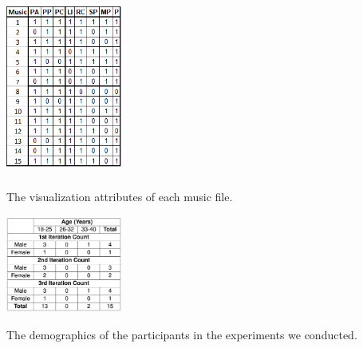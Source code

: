 \documentclass{sigchi-ext}
\begin{document}
\begin{marginfigure}[-7pc]
\begin{minipage}{\marginparwidth}
     \includegraphics[width=3.8cm,height=5.8cm]{figures/Visualizations.png}
    \caption{The visualization attributes of each music file.}
    \label{fig:visualizations}
    \end{minipage}
\end{marginfigure}

\begin{marginfigure}[0pc]
\begin{minipage}{\marginparwidth}
     \includegraphics[width=3.8cm,height=3.2cm]{figures/demographic.png}
    \caption{The demographics of the participants in the experiments we conducted.}
    \label{fig:demographic}
    \end{minipage}
\end{marginfigure}
\end{document}
